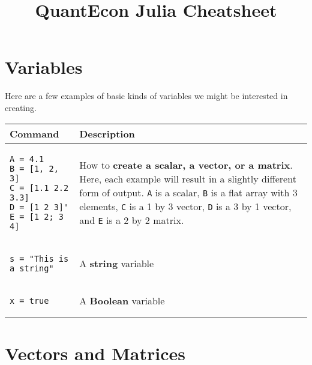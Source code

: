 \documentclass[]{article}
\begin{document}
\title{%
\textbf{QuantEcon Julia Cheatsheet}}
\date{}
\maketitle

\section{Variables}

Here are a few examples of basic kinds of variables we might be interested in creating.
\begin{longtable}{ |m{6cm}  | m{11cm} |}
	\hline
	\textbf{Command} & \textbf{Description}
	\\\hline
\begin{verbatim}
A = 4.1
B = [1, 2, 3]
C = [1.1 2.2 3.3]
D = [1 2 3]'
E = [1 2; 3 4]
\end{verbatim}
	& How to \textbf{create a scalar, a vector, or a matrix}. Here, each example will result in a slightly different form of output. \texttt{A} is a scalar, \texttt{B} is a flat array with 3 elements, \texttt{C} is a 1 by 3 vector, \texttt{D} is a 3 by 1 vector, and \texttt{E} is a 2 by 2 matrix.
	\\\hline
\begin{verbatim}
s = "This is a string"
\end{verbatim}
	& A \textbf{string} variable 
	\\\hline
\begin{verbatim}
x = true
\end{verbatim}
	& A \textbf{Boolean} variable 
	\\\hline
\end{longtable}

\section{Vectors and Matrices}
\end{document}
